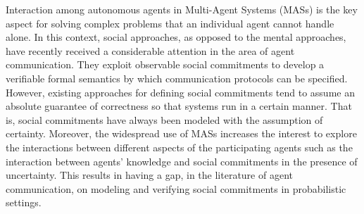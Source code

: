 
Interaction among autonomous agents in Multi-Agent Systems (MASs) is the key aspect for solving complex problems that an individual agent cannot handle alone. In this context, social approaches, as opposed to the mental approaches, have recently received a considerable attention in the area of agent communication. They exploit observable social commitments to develop a verifiable formal semantics by which communication protocols can be specified. However, existing approaches for defining social commitments tend to assume an absolute guarantee of correctness so that systems run in a certain manner. That is, social commitments have always been modeled with the assumption of certainty. Moreover, the widespread use of MASs increases the interest to explore the interactions between different aspects of the participating agents such as the interaction between agents' knowledge and social commitments in the presence of uncertainty. This results in having a gap, in the literature of agent communication, on modeling and verifying social commitments in probabilistic settings.


